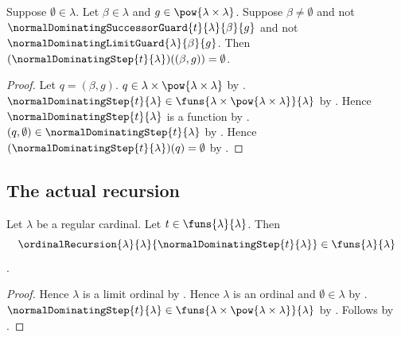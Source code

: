 \begin{proposition}\label{normal_dominating_step_fallback}
    Suppose $\emptyset\in\lambda$.
    Let $\beta\in\lambda$ and
        $g\in\pow{\lambda\times\lambda}$.
    Suppose $\beta\neq\emptyset$ and
        not $\normalDominatingSuccessorGuard{t}{\lambda}{\beta}{g}$ and
        not $\normalDominatingLimitGuard{\lambda}{\beta}{g}$.
    Then $(\normalDominatingStep{t}{\lambda})((\beta,g))
        =\emptyset$.
\end{proposition}
\begin{proof}
    Let $q=(\beta,g)$.
    $q\in\lambda\times\pow{\lambda\times\lambda}$ by
        .
    $\normalDominatingStep{t}{\lambda}
        \in\funs{\lambda\times\pow{\lambda\times\lambda}}{\lambda}$ by
        .
    Hence $\normalDominatingStep{t}{\lambda}$ is a function by
        .
    $(q,\emptyset)\in\normalDominatingStep{t}{\lambda}$ by
        .
    Hence $(\normalDominatingStep{t}{\lambda})(q)=\emptyset$ by
        .
\end{proof}

\subsection{The actual recursion}

\begin{proposition}\label{normal_dominating_recursion_type}
    Let $\lambda$ be a regular cardinal.
    Let $t\in\funs{\lambda}{\lambda}$.
    Then
    \[
        \ordinalRecursion{\lambda}{\lambda}
            {\normalDominatingStep{t}{\lambda}}
        \in\funs{\lambda}{\lambda}
    \].
\end{proposition}
\begin{proof}
    Hence $\lambda$ is a limit ordinal by
        .
    Hence $\lambda$ is an ordinal and $\emptyset\in\lambda$ by
        .
    $\normalDominatingStep{t}{\lambda}
        \in\funs{\lambda\times\pow{\lambda\times\lambda}}{\lambda}$ by
        .
    Follows by .
\end{proof}

